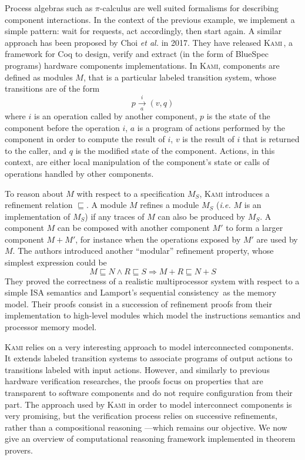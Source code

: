 Process algebras such as \( \pi \)-calculus are well suited formalisms for
describing component interactions.
%
In the context of the previous example, we implement a simple pattern: wait for
requests, act accordingly, then start again.
%
A similar approach has been proposed by Choi \emph{et al.} in 2017.
%
They have released {\scshape Kami}\,\cite{choi2017kami}, a framework for Coq to
design, verify and extract (in the form of BlueSpec\,\cite{nikhil2004bluespec}
programs) hardware components implementations.
%
In {\scshape Kami}, components are defined as modules \( M \), that is a
particular labeled transition system, whose transitions are of the form
%
\[
  p \xrightarrow[a]{i} (v, q)
\]
%
where \( i \) is an operation called by another component, \( p \) is the state
of the component before the operation \( i \), \( a \) is a program of actions
performed by the component in order to compute the result of \( i \), \( v \) is
the result of \( i \) that is returned to the caller, and \( q \) is the
modified state of the component.
%
Actions, in this context, are either local manipulation of the component's state
or calls of operations handled by other components.

To reason about \( M \) with respect to a specification \( M_S \), {\scshape
  Kami} introduces a refinement relation \( \sqsubseteq \).
%
A module \( M \) refines a module \( M_S \) (\emph{i.e.} \( M \) is an
implementation of \( M_S \)) if any traces of \( M \) can also be produced by
\( M_S \).
%
A component \( M \) can be composed with another component \( M' \) to form a
larger component \( M + M' \), for instance when the operations exposed by
\( M' \) are used by \( M \).
%
The authors introduced another ``modular'' refinement property, whose simplest
expression could be
%
\[
  M \sqsubseteq N \wedge R \sqsubseteq S \Rightarrow M + R \sqsubseteq N + S
\]
%
They proved the correctness of a realistic multiprocessor system with respect to
a simple ISA semantics and Lamport's sequential
consistency\,\cite{lamport1979sc} as the memory model.
%
Their proofs consist in a succession of refinement proofs from their
implementation to high-level modules which model the instructions semantics and
processor memory model.

{\scshape Kami} relies on a very interesting approach to model interconnected
components.
%
It extends labeled transition systems to associate programs of output actions to
transitions labeled with input actions.
%
However, and similarly to previous hardware verification researches, the proofs
focus on properties that are transparent to software components and do not
require configuration from their part.
%
The approach used by {\scshape Kami} in order to model interconnect components
is very promising, but the verification process relies on successive
refinements, rather than a compositional reasoning ---which remains our
objective.
%
%
%
We now give an overview of computational reasoning framework implemented in
theorem provers.


